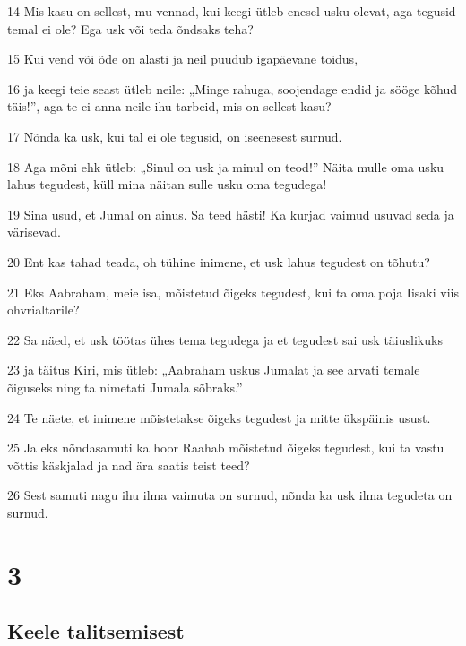 \par 14 Mis kasu on sellest, mu vennad, kui keegi ütleb enesel usku olevat, aga tegusid temal ei ole? Ega usk või teda õndsaks teha?
\par 15 Kui vend või õde on alasti ja neil puudub igapäevane toidus,
\par 16 ja keegi teie seast ütleb neile: „Minge rahuga, soojendage endid ja sööge kõhud täis!”, aga te ei anna neile ihu tarbeid, mis on sellest kasu?
\par 17 Nõnda ka usk, kui tal ei ole tegusid, on iseenesest surnud.
\par 18 Aga mõni ehk ütleb: „Sinul on usk ja minul on teod!” Näita mulle oma usku lahus tegudest, küll mina näitan sulle usku oma tegudega!
\par 19 Sina usud, et Jumal on ainus. Sa teed hästi! Ka kurjad vaimud usuvad seda ja värisevad.
\par 20 Ent kas tahad teada, oh tühine inimene, et usk lahus tegudest on tõhutu?
\par 21 Eks Aabraham, meie isa, mõistetud õigeks tegudest, kui ta oma poja Iisaki viis ohvrialtarile?
\par 22 Sa näed, et usk töötas ühes tema tegudega ja et tegudest sai usk täiuslikuks
\par 23 ja täitus Kiri, mis ütleb: „Aabraham uskus Jumalat ja see arvati temale õiguseks ning ta nimetati Jumala sõbraks.”
\par 24 Te näete, et inimene mõistetakse õigeks tegudest ja mitte ükspäinis usust.
\par 25 Ja eks nõndasamuti ka hoor Raahab mõistetud õigeks tegudest, kui ta vastu võttis käskjalad ja nad ära saatis teist teed?
\par 26 Sest samuti nagu ihu ilma vaimuta on surnud, nõnda ka usk ilma tegudeta on surnud.


\chapter{3}

\section*{Keele talitsemisest}

